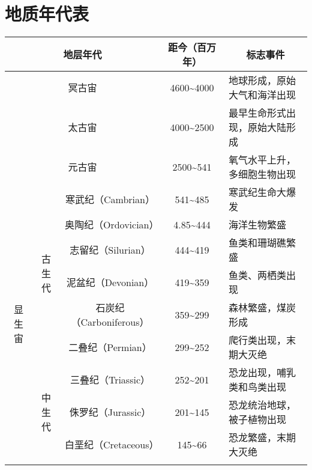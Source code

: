 \documentclass[b5paper,zihao=-4]{ctexbook}
\begin{document}
\chapter{地质年代表}
	\begin{landscape}
		\begin{table}[h!]
			\centering
			\begin{tabular}{|ccc|c|l|}
				\hline
				\multicolumn{3}{|c|}{地层年代} & 距今（百万年） & \multicolumn{1}{c|}{标志事件} \\ \hline
				\multicolumn{3}{|c|}{冥古宙} & 4600\textasciitilde 4000 & 地球形成，原始大气和海洋出现 \\ \hline
				\multicolumn{3}{|c|}{太古宙} & 4000\textasciitilde   2500 & 最早生命形式出现，原始大陆形成 \\ \hline
				\multicolumn{3}{|c|}{元古宙} & 2500\textasciitilde   541 & 氧气水平上升，多细胞生物出现 \\ \hline
				\multicolumn{1}{|c|}{\multirow{12}{*}{显生宙}} & \multicolumn{1}{c|}{\multirow{6}{*}{古生代}} & 寒武纪（Cambrian） & 541\textasciitilde   485 & 寒武纪生命大爆发 \\ \cline{3-5}
				\multicolumn{1}{|c|}{} & \multicolumn{1}{c|}{} & 奥陶纪（Ordovician） & 4.85\textasciitilde   444 & 海洋生物繁盛 \\ \cline{3-5}
				\multicolumn{1}{|c|}{} & \multicolumn{1}{c|}{} & 志留纪（Silurian） & 444\textasciitilde   419 & 鱼类和珊瑚礁繁盛 \\ \cline{3-5}
				\multicolumn{1}{|c|}{} & \multicolumn{1}{c|}{} & 泥盆纪（Devonian） & 419\textasciitilde   359 & 鱼类、两栖类出现 \\ \cline{3-5}
				\multicolumn{1}{|c|}{} & \multicolumn{1}{c|}{} & 石炭纪（Carboniferous） & 359\textasciitilde   299 & 森林繁盛，煤炭形成 \\ \cline{3-5}
				\multicolumn{1}{|c|}{} & \multicolumn{1}{c|}{} & 二叠纪（Permian） & 299\textasciitilde   252 & 爬行类出现，末期大灭绝 \\ \cline{2-5}
				\multicolumn{1}{|c|}{} & \multicolumn{1}{c|}{\multirow{3}{*}{中生代}} & 三叠纪（Triassic） & 252\textasciitilde   201 & 恐龙出现，哺乳类和鸟类出现 \\ \cline{3-5}
				\multicolumn{1}{|c|}{} & \multicolumn{1}{c|}{} & 侏罗纪（Jurassic） & 201\textasciitilde   145 & 恐龙统治地球，被子植物出现 \\ \cline{3-5}
				\multicolumn{1}{|c|}{} & \multicolumn{1}{c|}{} & 白垩纪（Cretaceous） & 145\textasciitilde   66 & 恐龙繁盛，末期大灭绝 \\ \cline{2-5}

\end{tabular}
\end{table}
\end{landscape}
\end{document}
